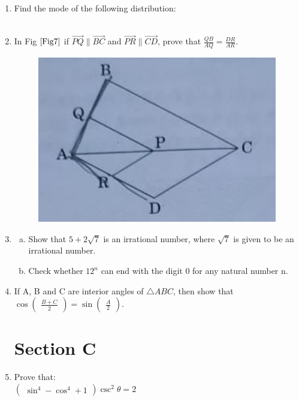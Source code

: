 \documentclass[journal,12pt,twocolumn]{IEEEtran}
\newcommand{\myvec}[1]{\ensuremath{\begin{pmatrix}#1\end{pmatrix}}}
\begin{document}
\begin{enumerate}[label=3.\arabic*]
     \item Find the mode of the following distribution:\\
     \vspace{2mm}\\
     \vspace{2mm}
     
    \item In Fig $\ref{Fig7}$ if $\vec{PQ} \parallel \vec{BC}$ and $\vec{PR} \parallel \vec{CD}$, prove that $\frac{QB}{AQ} = \frac{DR}{AR}$.\\
    \begin{figure}[h!]
        \centering
        \includegraphics[width=0.5\columnwidth,center]{Fig7.png}
    	\caption{}
    	\label{Fig7}
     \end{figure}
    
    \item 
    \begin{enumerate}[a)]
        \item Show that $5 + 2\sqrt{7}$ is an irrational number, where $\sqrt{7}$ is given to be an irrational number.\\
        \item Check whether $12^n$ can end with the digit 0 for any natural number n.\\
    \end{enumerate}
    
    \item If A, B and C are interior angles of $\triangle ABC$, then show that\\
    $\cos \myvec{\frac{B + C}{2}} = \sin \myvec{\frac{A}{2}}$.\\
\section{Section C}
    \item Prove that:\\
    $\myvec{\sin^4 - \cos^4 + 1} \csc^2\theta = 2$\\
    

\end{enumerate}
\end{document}
